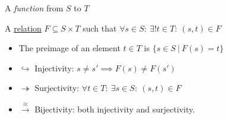 
A \emph{function} from $S$ to $T$

A \href{doc/1 math/Seven Sketches in Compositionality/1 Generative Effects/2 What is order/Relation}{relation} $F \subseteq S \times T$ such that $\forall s \in S:\ \exists! t \in T:\ (s,t) \in F$
\begin{itemize}
  \item The preimage of an element $t \in T$ is $\{s \in S\ |\ F(s)=t\}$
  \item $\hookrightarrow$ Injectivity: $s\ne s' \implies F(s)\ne F(s')$
  \item $\twoheadrightarrow$ Surjectivity: $\forall t \in T:\ \exists s \in S:\ (s,t) \in F$
  \item $\xrightarrow \cong$ Bijectivity: both injectivity and surjectivity.
\end{itemize}